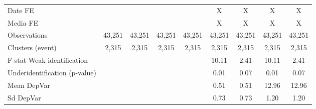 {\begin{tabular}{l*{8}{c}}
\hline
Date FE             &                     &                     &                     &                     &           X         &           X         &           X         &           X         \\
Media FE            &                     &                     &                     &                     &           X         &           X         &           X         &           X         \\
Observations        &      43,251         &      43,251         &      43,251         &      43,251         &      43,251         &      43,251         &      43,251         &      43,251         \\
Clusters (event)    &       2,315         &       2,315         &       2,315         &       2,315         &       2,315         &       2,315         &       2,315         &       2,315         \\
F-stat Weak identification&                     &                     &                     &                     &       10.11         &        2.41         &       10.11         &        2.41         \\
Underidentification (p-value)&                     &                     &                     &                     &        0.01         &        0.07         &        0.01         &        0.07         \\
Mean DepVar         &                     &                     &                     &                     &        0.51         &        0.51         &       12.96         &       12.96         \\
Sd DepVar           &                     &                     &                     &                     &        0.73         &        0.73         &        1.20         &        1.20         \\
\hline\hline
\end{tabular}
}
